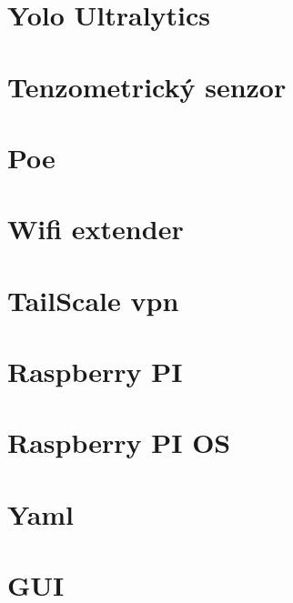 \section{Yolo Ultralytics}
\section{Tenzometrický senzor}
\section{Poe}
\section{Wifi extender}
\section{TailScale vpn}
\section{Raspberry PI}
\section{Raspberry PI OS}
\section{Yaml}
\section{GUI}




